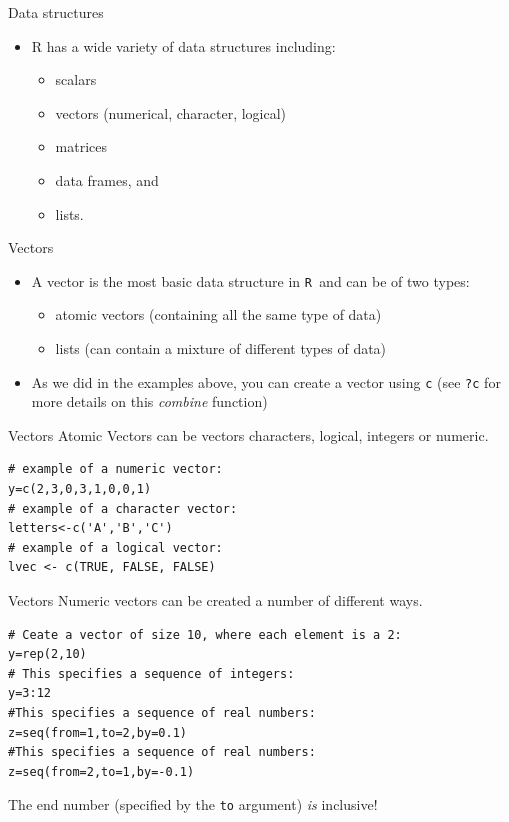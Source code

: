 \documentclass[xcolor=svgnames, 10pt]{beamer}
\newcommand{\R}{{\tt R }}
\begin{document}
\begin{frame}[fragile]{Data structures}
\begin{itemize}
\item R has a wide variety of data structures including:
\begin{itemize}
\item scalars
\item vectors (numerical, character, logical)
\item matrices
\item data frames, and
\item lists.
\end{itemize}
\end{itemize}
\end{frame}



\begin{frame}[fragile]{Vectors}
\begin{itemize}
\item A vector is the most basic data structure in \R and can be of two types:
\begin{itemize}
\item atomic vectors (containing all the same type of data)
\item lists (can contain a mixture of different types of data)
\end{itemize}
\item As we did in the examples above, you can create a vector using \texttt{c} (see {\tt ?c} for more details on this \textit{combine} function)
\end{itemize}
\end{frame}


\begin{frame}[fragile]{Vectors}
Atomic Vectors can be vectors characters, logical, integers or numeric.
\begin{Verbatim}[xleftmargin=0.3in]
# example of a numeric vector:
y=c(2,3,0,3,1,0,0,1)
# example of a character vector:
letters<-c('A','B','C')
# example of a logical vector:
lvec <- c(TRUE, FALSE, FALSE)
\end{Verbatim}

\end{frame}


\begin{frame}[fragile]{Vectors}
Numeric vectors can be created a number of different ways. 
\begin{Verbatim}[xleftmargin=0.3in]
# Ceate a vector of size 10, where each element is a 2:
y=rep(2,10)
# This specifies a sequence of integers:
y=3:12
#This specifies a sequence of real numbers:
z=seq(from=1,to=2,by=0.1)
#This specifies a sequence of real numbers:
z=seq(from=2,to=1,by=-0.1)
\end{Verbatim}
\begin{alertblock}{The end number (specified by the {\tt to} argument) \textit{is} inclusive!}
\end{alertblock}

\end{frame}
\end{document}
